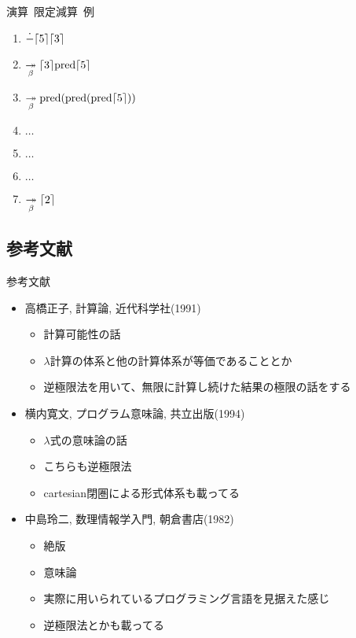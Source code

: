 \documentclass[pdflatex,17pt]{beamer}
\begin{document}
\begin{frame}{演算~限定減算~例}
    \begin{enumerate}
        \item $\dot{-}\lceil 5 \rceil\lceil 3 \rceil$
        \pause
        \item $\underset{\beta}{\twoheadrightarrow} \lceil 3 \rceil{\rm pred}\lceil 5 \rceil$
        \pause
        \item $\underset{\beta}{\twoheadrightarrow} {\rm pred}({\rm pred}({\rm pred}\lceil 5 \rceil))$
        \pause
        \item $\dots$
        \pause
        \item $\dots$
        \pause
        \item $\dots$
        \pause
        \item $\underset{\beta}{\twoheadrightarrow} \lceil 2 \rceil$
    \end{enumerate}
\end{frame}

\subsection{参考文献}
\begin{frame}{参考文献}
    \scriptsize
    \begin{itemize}
        \item 高橋正子, 計算論, 近代科学社(1991)
        \begin{itemize}
        \scriptsize
            \item 計算可能性の話
            \item $\lambda$計算の体系と他の計算体系が等価であることとか
            \item 逆極限法を用いて、無限に計算し続けた結果の極限の話をする
        \end{itemize}
        \item 横内寛文, プログラム意味論, 共立出版(1994)
        \begin{itemize}
        \scriptsize
            \item $\lambda$式の意味論の話
            \item こちらも逆極限法
            \item cartesian閉圏による形式体系も載ってる
        \end{itemize}
        \item 中島玲二, 数理情報学入門, 朝倉書店(1982)
        \begin{itemize}
        \scriptsize
            \item 絶版
            \item 意味論
            \item 実際に用いられているプログラミング言語を見据えた感じ
            \item 逆極限法とかも載ってる
        \end{itemize}
    \end{itemize}
\end{frame}
\end{document}
